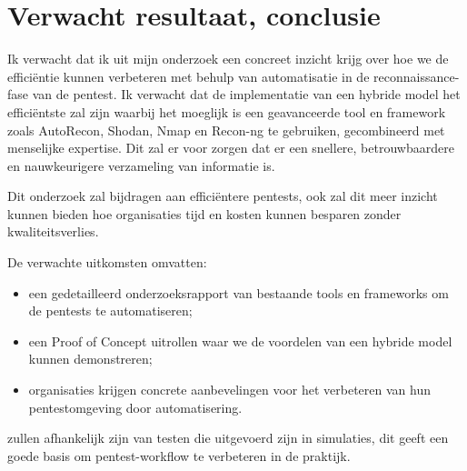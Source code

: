 

\section{Verwacht resultaat, conclusie}%
\label{sec:verwachte_resultaten}




Ik verwacht dat ik uit mijn onderzoek een concreet inzicht krijg over hoe we de efficiëntie kunnen verbeteren met behulp van
automatisatie in de reconnaissance-fase van de pentest. Ik verwacht dat de implementatie van een hybride model het efficiëntste
zal zijn waarbij het moeglijk is een geavanceerde tool en framework zoals AutoRecon, Shodan, Nmap en Recon-ng te gebruiken,
gecombineerd met menselijke expertise. Dit zal er voor zorgen dat er een snellere, betrouwbaardere en nauwkeurigere verzameling van informatie is.

Dit onderzoek zal bijdragen aan efficiëntere pentests, ook zal dit meer inzicht kunnen bieden hoe organisaties tijd en kosten
kunnen besparen zonder kwaliteitsverlies.

De verwachte uitkomsten omvatten:
\begin{itemize}
    \item een gedetailleerd onderzoeksrapport van bestaande tools en frameworks om de pentests te automatiseren;
    \item een Proof of Concept uitrollen waar we de voordelen van een hybride model kunnen demonstreren;
    \item organisaties krijgen concrete aanbevelingen voor het verbeteren van hun pentestomgeving door automatisering.
\end{itemize}


zullen afhankelijk zijn van testen die uitgevoerd zijn in simulaties, dit geeft een goede basis om 
pentest-workflow te verbeteren in de praktijk.